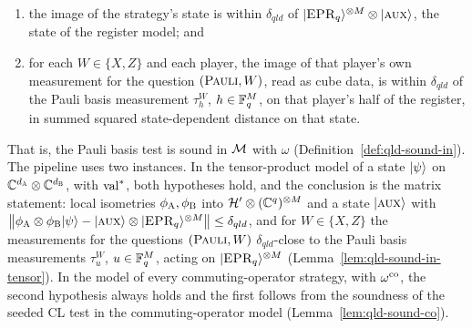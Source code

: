 \begin{theorem}
\begin{enumerate}
\item the image of the strategy's state is within $\delta_{qld}$ of
  $\ket{\EPR_q}^{\ot M} \ot \ket{\aux}$, the state of the register model; and
\item for each $W \in \{X, Z\}$ and each player, the image of that player's own measurement for the
  question $(\pauli, W)$, read as cube data, is within $\delta_{qld}$ of the Pauli basis
  measurement $\tau^W_h$, $h \in \F_q^M$, on that player's half of the register, in summed squared
  state-dependent distance on that state.
\end{enumerate}
That is, the Pauli basis test is sound in $\cal{M}$ with $\omega$
(Definition~\ref{def:qld-sound-in}). The pipeline uses two instances. In the tensor-product model of
a state $\ket{\psi}$ on $\C^{d_\alice} \ot \C^{d_\bob}$, with $\valstar$, both hypotheses hold, and
the conclusion is the matrix statement: local isometries $\phi_\alice, \phi_\bob$ into
$\mH' \ot (\C^q)^{\ot M}$ and a state $\ket{\aux}$ with
$\norm{\phi_\alice \ot \phi_\bob \ket{\psi} - \ket{\aux} \ot \ket{\EPR_q}^{\ot M}}
\leq \delta_{qld}$, and for $W \in \{X, Z\}$ the measurements for the questions $(\pauli, W)$
$\delta_{qld}$-close to the Pauli basis measurements $\tau^W_u$, $u \in \F_q^M$, acting on
$\ket{\EPR_q}^{\ot M}$ (Lemma~\ref{lem:qld-sound-in-tensor}). In the model of every
commuting-operator strategy, with $\omegaco$, the second hypothesis always holds and the first
follows from the soundness of the seeded CL test in the commuting-operator model
(Lemma~\ref{lem:qld-sound-co}).
\end{theorem}

